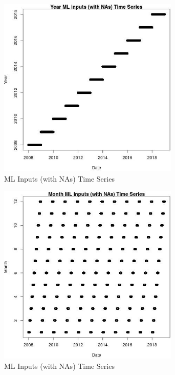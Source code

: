 \begin{figure} 
\centering  
\includegraphics[width=0.77\textwidth]{Code_Outputs/Report_ML_input_PM25_Step4_part_f_de_duplicated_aveswNAs_YearvDate.jpg} 
\caption{\label{fig:Report_ML_input_PM25_Step4_part_f_de_duplicated_aveswNAsYearvDate}ML Inputs (with NAs) Time Series} 
\end{figure} 
 

\begin{figure} 
\centering  
\includegraphics[width=0.77\textwidth]{Code_Outputs/Report_ML_input_PM25_Step4_part_f_de_duplicated_aveswNAs_MonthvDate.jpg} 
\caption{\label{fig:Report_ML_input_PM25_Step4_part_f_de_duplicated_aveswNAsMonthvDate}ML Inputs (with NAs) Time Series} 
\end{figure} 
 

